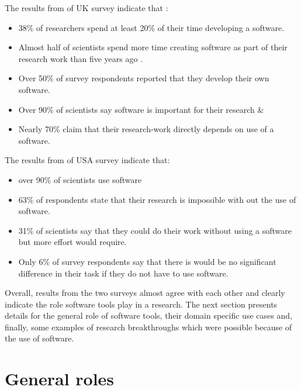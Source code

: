 The results from of \ac{UK} survey indicate that \citep{merali2010computational, nangia2017track}:
\begin{itemize}%
	\item 38\% of researchers spend at least 20\% of their time developing a software.
	\item Almost half of scientists spend more time creating software as part of their research work than five years ago .
	\item Over 50\% of survey respondents reported that they develop their own software. 
	\item Over 90\% of scientists say software is important for their research \&
	\item Nearly 70\% claim that their research-work directly depends on use of a software.  
	

\end{itemize}

The results from of \ac{USA} survey indicate that\citep{nangia2017track}:
\begin{itemize}%
	\item over 90\% of scientists use software 
	\item 63\% of respondents state that their research is impossible with out the use of software.
	\item 31\% of scientists say that they could do their work without using a software but more effort would require.
	\item Only 6\% of survey respondents say that there is would be no significant difference in their task if they do not have to use software. 
	
\end{itemize}

Overall, results from the two surveys almost agree with each other and clearly indicate the role software tools play in a research. The next section presents details for the general role of software tools, their domain specific use cases and, finally, some examples of research breakthroughs which were possible because of the use of software. 

\section{General roles}
\label{subsec:background:first_section:first_subsection}

